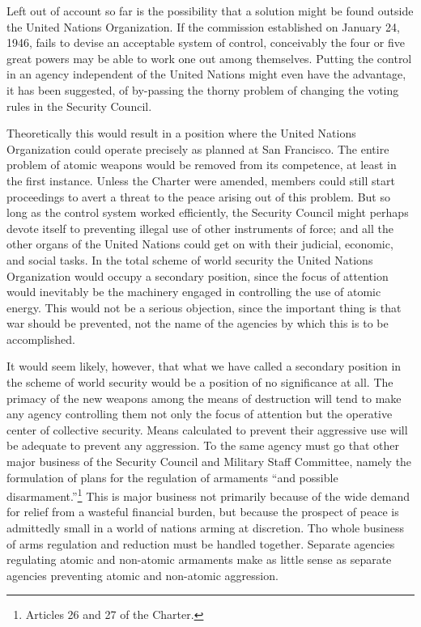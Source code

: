 Left out of account so far is the possibility that a solution might be found outside the United Nations Organization. If the commission established on January 24, 1946, fails to devise an acceptable system of control, conceivably the four or five great powers may be able to work one out among themselves. Putting the control in an agency independent of the United Nations might even have the advantage, it has been suggested, of by-passing the thorny problem of changing the voting rules in the Security Council.

Theoretically this would result in a position where the United Nations Organization could operate precisely as planned at San Francisco. The entire problem of atomic weapons would be removed from its competence, at least in the first instance. Unless the Charter were amended, members could still start proceedings to avert a threat to the peace arising out of this problem. But so long as the control system worked efficiently, the Security Council might perhaps devote itself to preventing illegal use of other instruments of force; and all the other organs of the United Nations could get on with their judicial, economic, and social tasks. In the total scheme of world security the United Nations Organization would occupy a secondary position, since the focus of attention would inevitably be the machinery engaged in controlling the use of atomic energy. This would not be a serious objection, since the important thing is that war should be prevented, not the name of the agencies by which this is to be accomplished.

It would seem likely, however, that what we have called a secondary position in the scheme of world security would be a position of no significance at all. The primacy of the new weapons among the means of destruction will tend to make any agency controlling them not only the focus of attention but the operative center of collective security. Means calculated to prevent their aggressive use will be adequate to prevent any aggression. To the same agency must go that other major business of the Security Council and Military Staff Committee, namely the formulation of plans for the regulation of armaments ``and possible disarmament.''\footnote{Articles 26 and 27 of the Charter.} This is major business not primarily because of the wide demand for relief from a wasteful financial burden, but because the prospect of peace is admittedly small in a world of nations arming at discretion. Tho whole business of arms regulation and reduction must be handled together. Separate agencies regulating atomic and non-atomic armaments make as little sense as separate agencies preventing atomic and non-atomic aggression.

